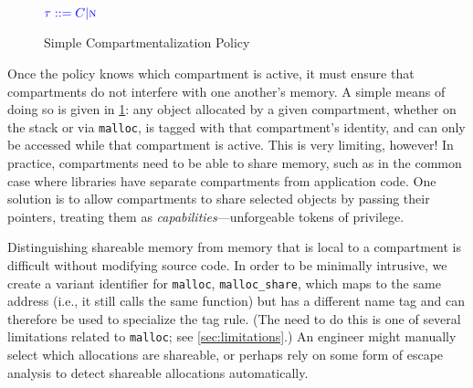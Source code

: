 \documentclass{llncs}
\begin{document}
\begin{figure}[t]
  \color{blue}
  \begin{minipage}[t]{0.3\textwidth}
    \vspace{-2em}
    \(\color{blue} \tau ::= C | \textnormal{\color{blue} \sc n}\)

  
  \end{minipage}
  \scriptsize
  \begin{minipage}[t]{0.25\textwidth}
  \end{minipage}
  \begin{minipage}[t]{0.25\textwidth}
    
  \end{minipage}
    
  \caption{Simple Compartmentalization Policy}
  \label{fig:compartments}
\end{figure}

Once the policy knows which compartment is active, it must ensure that compartments do not interfere with
one another's memory. A simple means of doing so is given in \cref{fig:compartments}: any object allocated by
a given compartment, whether on the stack or via {\tt malloc}, is tagged with that compartment's identity,
and can only be accessed while that compartment is active.
This is very limiting, however! In practice, compartments need to be able to share memory, such as in the
common case where libraries have separate compartments from application code. One solution is to allow
compartments to share selected objects by passing their pointers, treating them as
{\em capabilities}---unforgeable tokens of privilege.

Distinguishing shareable memory from memory that is local to a compartment is difficult
without modifying source code. In order to be minimally intrusive, we
create a variant identifier for {\tt malloc}, {\tt malloc\_share}, which maps to the same
address (i.e., it still calls the same function) but has a different name tag and can therefore
be used to specialize the tag rule. (The need to do this is one of several limitations related
to {\tt malloc}; see \cref{sec:limitations}.) An engineer might manually select which allocations are
shareable, or perhaps rely on some form of escape analysis to detect shareable allocations automatically.
\end{document}
